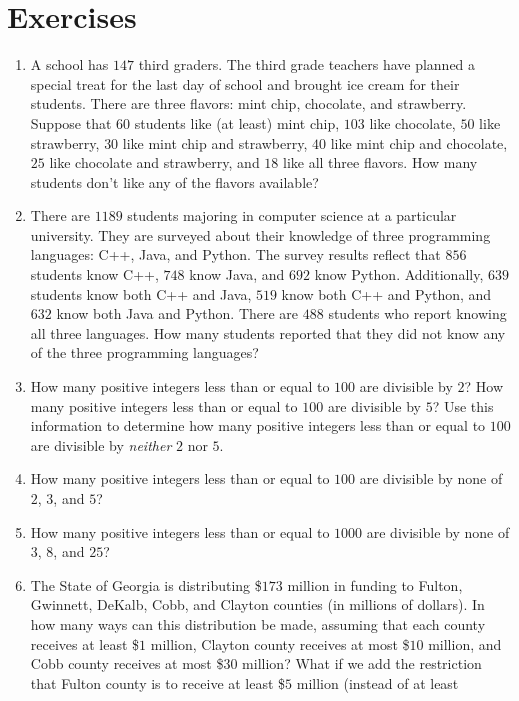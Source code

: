 \section{Exercises}\label{s:inclusion-exclusion:exercises}

\begin{enumerate}
\item A school has $147$ third graders. The third grade teachers have
  planned a special treat for the last day of school and brought ice
  cream for their students. There are three flavors: mint chip,
  chocolate, and strawberry. Suppose that $60$ students like (at
  least) mint chip, $103$ like chocolate, $50$ like strawberry, $30$
  like mint chip and strawberry, $40$ like mint chip and chocolate,
  $25$ like chocolate and strawberry, and $18$ like all three
  flavors. How many students don't like any of the flavors available?
\item There are $1189$ students majoring in computer science at a
  particular university. They are surveyed about their knowledge of
  three programming languages: C++, Java, and Python. The survey
  results reflect that $856$ students know C++, $748$ know Java, and
  $692$ know Python. Additionally, $639$ students know both C++ and
  Java, $519$ know both C++ and Python, and $632$ know both Java and
  Python. There are $488$ students who report knowing all three
  languages. How many students reported that they did not know any of
  the three programming languages?
\item How many positive integers less than or equal to $100$ are
  divisible by $2$? How many positive integers less than or equal to
  $100$ are divisible by $5$? Use this information to determine how
  many positive integers less than or equal to $100$ are divisible by
  \emph{neither} $2$ nor $5$.
\item How many positive integers less than or equal to $100$ are
  divisible by none of $2$, $3$, and $5$?
\item How many positive integers less than or equal to $1000$ are
  divisible by none of $3$, $8$, and $25$?
\item The State of Georgia is distributing \$$173$ million in funding
  to Fulton, Gwinnett, DeKalb, Cobb, and Clayton counties (in millions
  of dollars). In how many ways can this distribution be made,
  assuming that each county receives at least \$$1$ million, Clayton
  county receives at most \$$10$ million, and Cobb county receives at
  most \$$30$ million? What if we add the restriction that Fulton
  county is to receive at least \$$5$ million (instead of at least

\end{enumerate}
